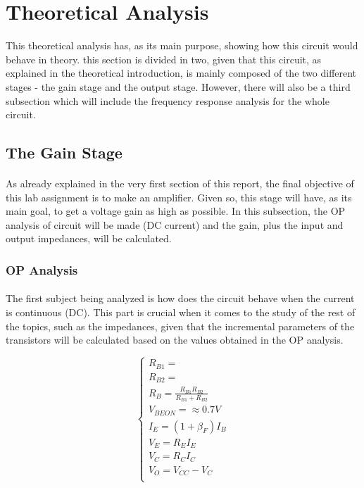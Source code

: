 \section{Theoretical Analysis}

This theoretical analysis has, as its main purpose, showing how this circuit would behave in theory. this section is divided in two, given that this circuit, as explained in the theoretical introduction, is mainly composed of the two different stages - the gain stage and the output stage. However, there will also be a third subsection which will include the frequency response analysis for the whole circuit.



\subsection{The Gain Stage}

\paragraph{}As already explained in the very first section of this report, the final objective of this lab assignment is to make an amplifier. Given so, this stage will have, as its main goal, to get a voltage gain as high as possible. In this subsection, the OP analysis of circuit will be made (DC current) and the gain, plus the input and output impedances,  will be calculated.


\subsubsection{OP Analysis}

\paragraph{}The first subject being analyzed is how does the circuit behave when the current is continuous (DC). This part is crucial when it comes to the study of the rest of the topics, such as the impedances, given that the incremental parameters of the transistors will be calculated based on the values obtained in the OP analysis.


\[ 
\left\{\begin{matrix}
R_{B1}=\\
R_{B2}=\\
R_B=\frac{R_{B1}R_{B2}}{R_{B1}+R_{B2}}\\
V_{BEON}=\approx 0.7 V\\
I_E=(1+\beta_F)I_B\\
V_E=R_E I_E\\
V_C=R_C I_C\\
V_O=V_{CC}-V_C\\
\end{matrix}\right.
\]


